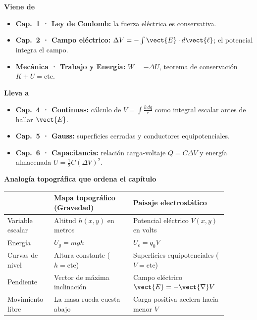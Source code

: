 \documentclass[11pt]{article}
\begin{document}
\begin{minipage}[t]{0.48\linewidth}\small
{\sffamily\small\bfseries\color{e10primary}Viene de}
\begin{itemize}[leftmargin=*,itemsep=1pt,topsep=2pt]
  \item \textbf{Cap.~1 · Ley de Coulomb:} la fuerza eléctrica es conservativa.
  \item \textbf{Cap.~2 · Campo eléctrico:} $\Delta V=-\int \vect{E}\cdot d\vect{\ell}$; el potencial integra el campo.
  \item \textbf{Mecánica · Trabajo y Energía:} $W=-\Delta U$, teorema de conservación $K+U=\text{cte}$.
\end{itemize}
\end{minipage}\hfill
\begin{minipage}[t]{0.48\linewidth}\small
{\sffamily\small\bfseries\color{e10accentstrong}Lleva a}
\begin{itemize}[leftmargin=*,itemsep=1pt,topsep=2pt]
  \item \textbf{Cap.~4 · Continuas:} cálculo de $V=\int \frac{k\,dq}{r}$ como integral escalar antes de hallar $\vect{E}$.
  \item \textbf{Cap.~5 · Gauss:} superficies cerradas y conductores equipotenciales.
  \item \textbf{Cap.~6 · Capacitancia:} relación carga-voltaje $Q=C\Delta V$ y energía almacenada $U=\frac{1}{2}C(\Delta V)^2$.
\end{itemize}
\end{minipage}

\medskip
{\sffamily\small\bfseries Analogía topográfica que ordena el capítulo}
\renewcommand{\arraystretch}{1.25}
\begin{center}\footnotesize
\begin{tabular}{>{\raggedright\arraybackslash}p{0.2\linewidth} >{\centering\arraybackslash}p{0.34\linewidth} >{\centering\arraybackslash}p{0.34\linewidth}}
\toprule
 & {\sffamily\bfseries Mapa topográfico (Gravedad)} & {\sffamily\bfseries Paisaje electrostático}\\
\midrule
Variable escalar & Altitud $h(x,y)$ en metros & Potencial eléctrico $V(x,y)$ en volts\\
Energía & $U_g=mgh$ & $U_e=q_0V$\\
Curvas de nivel & Altura constante ($h=\text{cte}$) & Superficies equipotenciales ($V=\text{cte}$)\\
Pendiente & Vector de máxima inclinación & Campo eléctrico $\vect{E}=-\vect{\nabla}V$\\
Movimiento libre & La masa rueda cuesta abajo & Carga positiva acelera hacia menor $V$\\
\bottomrule
\end{tabular}
\end{center}
\end{document}
